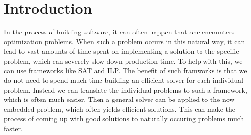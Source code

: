 \chapter{Introduction}


In the process of building software, it can often happen that one encounters optimization problems.
When such a problem occurs in this natural way, it can lead to vast amounts of time spent on implementing a solution to the specific problem, which can severely slow down production time.
To help with this, we can use frameworks like SAT and ILP.
The benefit of such framworks is that we do not need to spend much time building an efficient solver for each individual problem.
Instead we can translate the individual problems to such a framework, which is often much easier.
Then a general solver can be applied to the now embedded problem, which often yields efficient solutions.
This can make the process of coming up with good solutions to naturally occuring problems much faster.

